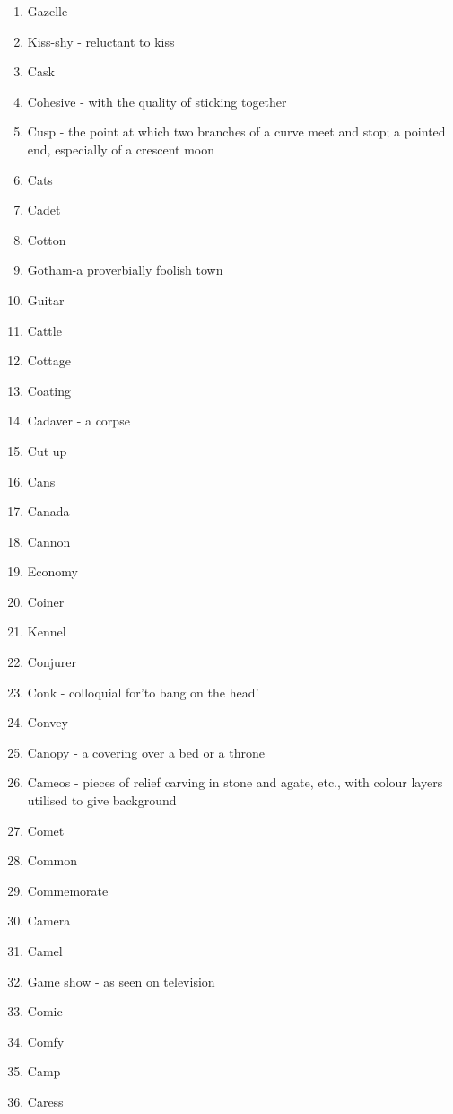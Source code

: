 \begin{enumerate}
        \item Gazelle
        \item Kiss-shy - reluctant to kiss
        \item Cask
        \item Cohesive - with the quality of sticking together
        \item Cusp - the point at which two branches of a curve meet and stop; a pointed end, especially of a crescent moon
        \item Cats
        \item Cadet
        \item Cotton
        \item Gotham-a proverbially foolish town
        \item Guitar
        \item Cattle
        \item Cottage
        \item Coating
        \item Cadaver - a corpse
        \item Cut up
        \item Cans
        \item Canada
        \item Cannon
        \item Economy
        \item Coiner
        \item Kennel
        \item Conjurer
        \item Conk - colloquial for'to bang on the head'
        \item Convey
        \item Canopy - a covering over a bed or a throne
        \item Cameos - pieces of relief carving in stone and agate, etc., with colour layers utilised to give background
        \item Comet
        \item Common
        \item Commemorate
        \item Camera
        \item Camel
        \item Game show - as seen on television
        \item Comic
        \item Comfy
        \item Camp
        \item Caress

\end{enumerate}
